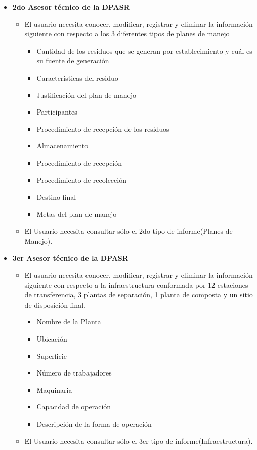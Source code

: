 \begin{itemize}
		\item \textbf{2do Asesor técnico de la DPASR }
		\begin{itemize}
			\item El usuario necesita conocer, modificar, registrar y eliminar la información siguiente con respecto a los 3 diferentes tipos de planes de manejo
			\begin{itemize}
				\item Cantidad de los residuos que se generan  por establecimiento y cuál es su fuente de generación
				\item Características del residuo
				\item Justificación del plan de manejo        
				\item Participantes
				\item Procedimiento de recepción  de los residuos
				\item Almacenamiento
				\item Procedimiento de recepción    
				\item Procedimiento de  recolección
				\item Destino final
				\item Metas del plan de manejo
			\end{itemize}
			\item El Usuario necesita consultar sólo el 2do tipo de informe(Planes de Manejo).
		\end{itemize}
	\item \textbf{3er Asesor técnico de la DPASR}
	\begin{itemize}
		\item El usuario necesita conocer, modificar, registrar y eliminar la información siguiente con respecto a la infraestructura conformada por 12 estaciones de transferencia, 3 plantas de separación, 1 planta de composta y un sitio de disposición final.
		\begin{itemize}
				\item Nombre de la Planta
				\item Ubicación
				\item Superficie 
				\item Número de trabajadores
				\item Maquinaria
				\item Capacidad de operación 
				\item Descripción de la forma de operación
		\end{itemize}
		\item El Usuario necesita consultar sólo el 3er tipo de informe(Infraestructura).
	\end{itemize}
	

\end{itemize}
